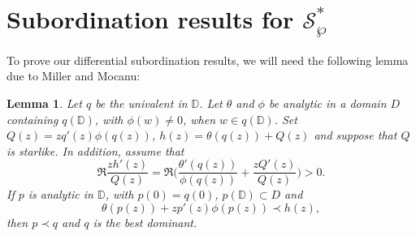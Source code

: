 \documentclass[12pt, reqno]{amsart}
\numberwithin{equation}{section}
\theoremstyle{plain}
\newtheorem{lemma}{Lemma}[section]
\theoremstyle{definition}
\theoremstyle{remark}
\begin{document}
\section{Subordination results for $\mathcal{S}^*_{\wp}$}
To prove our differential subordination results, we will need the following lemma due to Miller and Mocanu:
\begin{lemma}\cite{sub-pg132} \label{L1}
	Let $q$ be the univalent in $\mathbb{D}$. Let $\theta$ and $\phi$ be analytic 
	in a domain $D$ containing $q(\mathbb{D})$, with $\phi(w)\neq0$, when $w\in q(\mathbb{D})$. Set $Q(z)=zq'(z)\phi(q(z))$, $h(z)=\theta(q(z))+Q(z)$ and suppose that $Q$ is starlike. In addition, assume that
	\begin{equation*}
	\Re\frac{zh'(z)}{Q(z)}=\Re\biggl(\frac{\theta'(q(z))}{\phi(q(z))}+\frac{zQ'(z)}{Q(z)}\biggl)>0.
	\end{equation*}
	If $p$ is analytic in $\mathbb{D}$, with $p(0)=q(0)$, $p(\mathbb{D})\subset D$ and 
	\begin{equation}
	\theta(p(z))+zp'(z)\phi(p(z)) \prec h(z),
	\end{equation}
	then $p\prec q$ and $q$ is the best dominant.
\end{lemma}
\end{document}
